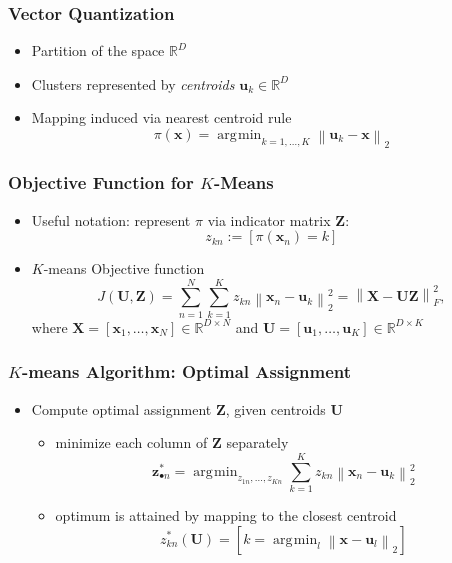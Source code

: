 \documentclass[conference,11pt]{IEEEtran}
\DeclareMathOperator*{\argmin}{\arg\!\min}
\newcommand{\iver}[1]{\left[#1\right]}
\newcommand{\norm}[1]{\left\lVert#1\right\rVert}
\newcommand{\matr}[1]{\boldsymbol{\mathbf{#1}}}
\newcommand{\vect}[1]{\boldsymbol{\mathbf{#1}}}
\newcommand{\R}{\mathbb{R}}
\begin{document}
\subsubsection{Vector Quantization}
\begin{itemize}
  \item Partition of the space $\R^D$
  \item Clusters represented by \emph{centroids} $\vect{u}_k \in \R^D$
  \item Mapping induced via nearest centroid rule
    \[ \pi(\vect{x}) = \argmin_{k=1,\ldots,K} \norm{\vect{u}_k - \vect{x}}_2 \]
\end{itemize}

\subsubsection{Objective Function for $K$-Means}
\begin{itemize}
  \item Useful notation: represent $\pi$ via indicator matrix $\matr{Z}$:
    \[ z_{kn} := \iver{\pi(\vect{x}_n) = k} \]
  \item $K$-means Objective function
    \[
      J(\matr{U},\matr{Z}) = \sum_{n=1}^N \sum_{k=1}^K z_{kn} \norm{\vect{x}_n
        - \vect{u}_k}_2^2 = \norm{\matr{X} - \matr{U}\matr{Z}}_F^2,
    \]
    where $\matr{X} = [\vect{x}_1,\ldots,\vect{x}_N] \in \R^{D \times N}$
    and   $\matr{U} = [\vect{u}_1,\ldots,\vect{u}_K] \in \R^{D \times K}$
\end{itemize}

\subsubsection{$K$-means Algorithm: Optimal Assignment}
\begin{itemize}
  \item Compute optimal assignment $\matr{Z}$, given centroids $\matr{U}$
    \begin{itemize}
      \item minimize each column of $\matr{Z}$ separately
        \[
          \vect{z}_{\bullet n}^* = \argmin_{z_{1n},\ldots,z_{Kn}} \sum_{k=1}^K
          z_{kn} \norm{\vect{x}_n - \vect{u}_k}_2^2
        \]
      \item optimum is attained by mapping to the closest centroid
        \[
          z_{kn}^*(\matr{U}) = \iver{k = \argmin_l \norm{\vect{x} - \vect{u}_l}_2}
        \]
    \end{itemize}
\end{itemize}
\end{document}
